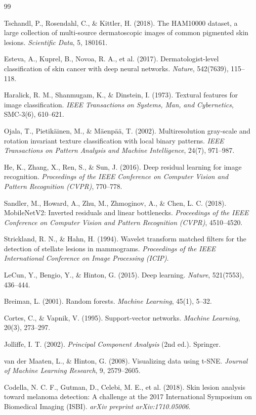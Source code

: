 \documentclass[UTF8,a4paper,12pt]{ctexart}
\numberwithin{figure}{section}
\numberwithin{table}{section}
\begin{document}
\begin{thebibliography}{99}

Tschandl, P., Rosendahl, C., \& Kittler, H. (2018).
The HAM10000 dataset, a large collection of multi-source dermatoscopic images of common pigmented skin lesions.
\textit{Scientific Data}, 5, 180161.

Esteva, A., Kuprel, B., Novoa, R. A., et al. (2017).
Dermatologist-level classification of skin cancer with deep neural networks.
\textit{Nature}, 542(7639), 115–118.

Haralick, R. M., Shanmugam, K., \& Dinstein, I. (1973).
Textural features for image classification.
\textit{IEEE Transactions on Systems, Man, and Cybernetics}, SMC-3(6), 610–621.

Ojala, T., Pietikäinen, M., \& Mäenpää, T. (2002).
Multiresolution gray-scale and rotation invariant texture classification with local binary patterns.
\textit{IEEE Transactions on Pattern Analysis and Machine Intelligence}, 24(7), 971–987.

He, K., Zhang, X., Ren, S., \& Sun, J. (2016).
Deep residual learning for image recognition.
\textit{Proceedings of the IEEE Conference on Computer Vision and Pattern Recognition (CVPR)}, 770–778.

Sandler, M., Howard, A., Zhu, M., Zhmoginov, A., \& Chen, L. C. (2018).
MobileNetV2: Inverted residuals and linear bottlenecks.
\textit{Proceedings of the IEEE Conference on Computer Vision and Pattern Recognition (CVPR)}, 4510–4520.

Strickland, R. N., \& Hahn, H. (1994).
Wavelet transform matched filters for the detection of stellate lesions in mammograms.
\textit{Proceedings of the IEEE International Conference on Image Processing (ICIP)}.

LeCun, Y., Bengio, Y., \& Hinton, G. (2015).
Deep learning.
\textit{Nature}, 521(7553), 436–444.

Breiman, L. (2001).
Random forests.
\textit{Machine Learning}, 45(1), 5–32.

Cortes, C., \& Vapnik, V. (1995).
Support-vector networks.
\textit{Machine Learning}, 20(3), 273–297.

Jolliffe, I. T. (2002).
\textit{Principal Component Analysis} (2nd ed.).
Springer.

van der Maaten, L., \& Hinton, G. (2008).
Visualizing data using t-SNE.
\textit{Journal of Machine Learning Research}, 9, 2579–2605.

Codella, N. C. F., Gutman, D., Celebi, M. E., et al. (2018).
Skin lesion analysis toward melanoma detection: A challenge at the 2017 International Symposium on Biomedical Imaging (ISBI).
\textit{arXiv preprint arXiv:1710.05006}.

\end{thebibliography}
\end{document}
